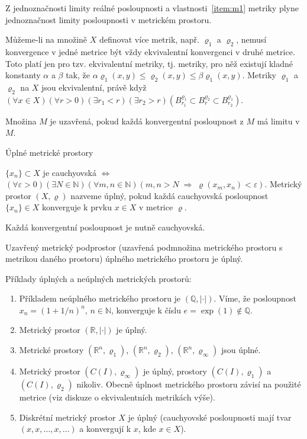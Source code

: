 Z jednoznačnosti limity reálné posloupnosti a vlastnosti~\ref{item:m1}
metriky plyne jednoznačnost limity posloupnosti v metrickém prostoru.

Můžeme-li na množině $X$ definovat více metrik, např. $\varrho_1$ a $\varrho_2$,
nemusí konvergence v jedné metrice být vždy ekvivalentní konvergenci v druhé metrice.
Toto platí jen pro tzv. ekvivalentní metriky, tj. metriky, pro něž existují
kladné konstanty $\alpha$ a $\beta$ tak, že 
$\alpha\varrho_1(x,y)\leq\varrho_2(x,y)\leq\beta\varrho_1(x,y)$.
Metriky $\varrho_1$ a $\varrho_2$ na $X$ jsou ekvivalentní, právě když
$(\forall x\in X)(\forall r>0)(\exists r_1<r)(\exists r_2>r)
 (B_{r_1}^{\varrho_1}\subset B_r^{\varrho_2}\subset B_{r_2}^{\varrho_1})$.

Množina $M$ je uzavřená, pokud každá konvergentní posloupnost z $M$
má limitu v $M$.

{Úplné metrické prostory}

$\{x_n\}\subset X$ je cauchyovská $\Leftrightarrow$
$(\forall\varepsilon>0)(\exists N\in\mathbb{N})(\forall m,n\in\mathbb{N})
(m,n>N\;\Rightarrow\;\varrho(x_m,x_n)<\varepsilon)$.
Metrický prostor $(X,\varrho)$ nazveme úplný, pokud každá cauchyovská posloupnost
$\{x_n\}\in X$ konverguje k prvku $x\in X$ v metrice $\varrho$.

Každá konvergentní posloupnost je nutně cauchyovská.

Uzavřený metrický podprostor (uzavřená podmnožina metrického prostoru
s metrikou daného prostoru) úplného metrického prostoru je úplný.

Příklady úplných a neúplných metrických prostorů:
   \begin{enumerate}
   \item Příkladem neúplného metrického prostoru je $(\mathbb{Q},|\cdot|)$.
         Víme, že posloupnost $x_n=(1+1/n)^n$, $n\in\mathbb{N}$,
         konverguje k číslu $e=\exp(1)\not\in\mathbb{Q}$.
   \item Metrický prostor $(\mathbb{R},|\cdot|)$ je úplný.
   \item Metrické prostory 
         $(\mathbb{R}^n,\varrho_1)$, $(\mathbb{R}^n,\varrho_2)$, 
         $(\mathbb{R}^n,\varrho_{\infty})$ jsou úplné.
   \item Metrický prostor $(C(I),\varrho_{\infty})$ je úplný,
         prostory $(C(I),\varrho_{1})$ a $(C(I),\varrho_{2})$ nikoliv.
         Obecně úplnost metrického prostoru závisí na použité metrice
         (viz diskuze o ekvivalentních metrikách výše).
   \item Diskrétní metrický prostor $X$ je úplný
         (cauchyovské posloupnosti mají tvar $(x,x,\ldots,x,\ldots)$
         a konvergují k $x$, kde $x\in X$).
   \end{enumerate}

